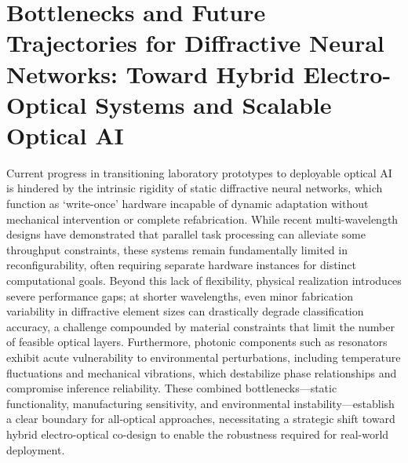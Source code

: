 \section{Bottlenecks and Future Trajectories for Diffractive Neural Networks: Toward Hybrid Electro-Optical Systems and Scalable Optical AI}\label{bottlenecks-and-future-trajectories-for-diffractive-neural-networks-toward-hybrid-electro-optical-systems-and-scalable-optical-ai}

Current progress in transitioning laboratory prototypes to deployable optical AI is hindered by the intrinsic rigidity of static diffractive neural networks, which function as `write-once' hardware incapable of dynamic adaptation without mechanical intervention or complete refabrication. While recent multi-wavelength designs have demonstrated that parallel task processing can alleviate some throughput constraints, these systems remain fundamentally limited in reconfigurability, often requiring separate hardware instances for distinct computational goals. Beyond this lack of flexibility, physical realization introduces severe performance gaps; at shorter wavelengths, even minor fabrication variability in diffractive element sizes can drastically degrade classification accuracy, a challenge compounded by material constraints that limit the number of feasible optical layers. \citep{doi_10_1109_tmag_2023_3281842_3e98eb7f} Furthermore, photonic components such as resonators exhibit acute vulnerability to environmental perturbations, including temperature fluctuations and mechanical vibrations, which destabilize phase relationships and compromise inference reliability. These combined bottlenecks---static functionality, manufacturing sensitivity, and environmental instability---establish a clear boundary for all-optical approaches, necessitating a strategic shift toward hybrid electro-optical co-design to enable the robustness required for real-world deployment. \citep{doi_10_1515_nanoph_2022_0615_9a3be8d6} \citep{doi_10_1002_adpr_202300310_6647aa64} \citep{doi_10_3390_nano14080697_c372a140} \citep{doi_10_1002_nap2_70185_56c8ab30}

